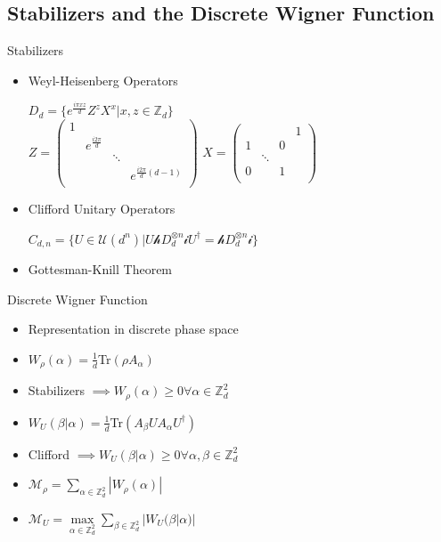 \documentclass{beamer}
\begin{document}
\subsection{Stabilizers and the Discrete Wigner Function}
\begin{frame}{Stabilizers}
\begin{itemize}
\item<2-> Weyl-Heisenberg Operators
\begin{center}
$D_d = \{e^{\frac{i\pi x z}{d}}Z^zX^x | x,z \in \mathbb{Z}_d\}$\\
$Z = \left( \begin{array}{cccc}
	1 & &  & \\
	 & e^{\frac{i2\pi}{d}} &  & \\
	 & & \ddots & \\
	 & & & e^{\frac{i2\pi}{d}(d-1)}\\
	\end{array} \right)$
$X = \left( \begin{array}{cccc}
	 & & & 1\\
	1 & & 0 &\\
	 & \ddots & &\\
	0 & & 1 &\\
	\end{array} \right)$
\end{center}
\item<3-> Clifford Unitary Operators
\begin{center}
$C_{d,n} = \{U\in\mathcal{U}(d^n) | U \mathcal{h}D_d^{\otimes n}\mathcal{i} U^\dag = \mathcal{h}D_d^{\otimes n}\mathcal{i}\}$
\end{center}
\item<4-> Gottesman-Knill Theorem
\end{itemize}
\end{frame}

\begin{frame}{Discrete Wigner Function}
\begin{itemize}
\item<2-> Representation in discrete phase space
\item<3-> $W_\rho(\alpha) = \frac{1}{d}$Tr$(\rho A_\alpha)$
\item<3-> Stabilizers $\implies W_\rho(\alpha) \ge 0 \forall \alpha \in \mathbb{Z}_d^2$
\item<4->$W_U(\beta | \alpha) = \frac{1}{d}$Tr$(A_\beta U A_\alpha U^\dag)$
\item<4->Clifford $\implies W_U(\beta | \alpha) \ge 0 \forall \alpha,\beta \in \mathbb{Z}_d^2$
\item<5-> $\mathcal{M}_\rho = \sum\limits_{\alpha \in \mathbb{Z}_d^2} |W_\rho(\alpha)|$
\item<5-> $\mathcal{M}_U = \max\limits_{\alpha \in \mathbb{Z}_d^2} \sum\limits_{\beta \in \mathbb{Z}_d^2} |W_U(\beta | \alpha)|$
\end{itemize}
\end{frame}
\end{document}

